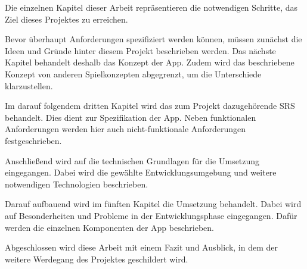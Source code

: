 Die einzelnen Kapitel dieser Arbeit repräsentieren die notwendigen Schritte, das Ziel dieses Projektes zu erreichen.

Bevor überhaupt Anforderungen spezifiziert werden können, müssen zunächst die Ideen und Gründe hinter diesem Projekt beschrieben werden. Das nächste Kapitel behandelt deshalb das Konzept der App. Zudem wird das beschriebene Konzept von anderen Spielkonzepten abgegrenzt, um die Unterschiede klarzustellen.

Im darauf folgendem dritten Kapitel wird das zum Projekt dazugehörende \acf{SRS} behandelt. Dies dient zur Spezifikation der App. Neben funktionalen Anforderungen werden hier auch nicht-funktionale Anforderungen festgeschrieben.

Anschließend wird auf die technischen Grundlagen für die Umsetzung eingegangen. Dabei wird die gewählte Entwicklungsumgebung und weitere notwendigen Technologien beschrieben.

Darauf aufbauend wird im fünften Kapitel die Umsetzung behandelt. Dabei wird auf Besonderheiten und Probleme in der Entwicklungsphase eingegangen. Dafür werden die einzelnen Komponenten der App beschrieben.

Abgeschlossen wird diese Arbeit mit einem Fazit und Ausblick, in dem der weitere Werdegang des Projektes geschildert wird.